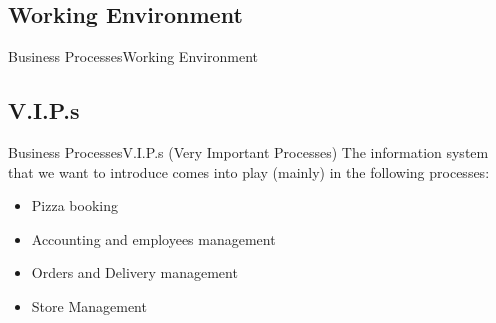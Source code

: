 \documentclass{beamer}
\begin{document}
\subsection{Working Environment}
\begin{frame}{Business Processes}{Working Environment}
\end{frame}

\subsection{V.I.P.s}
\begin{frame}{Business Processes}{V.I.P.s (Very Important Processes)}
 The information system that we want to introduce comes into play (mainly) in the following processes:
 \begin{itemize}
  \item Pizza booking
  \item Accounting and employees management
  \item Orders and Delivery management
  \item Store Management
 \end{itemize}
\end{frame}
\end{document}
